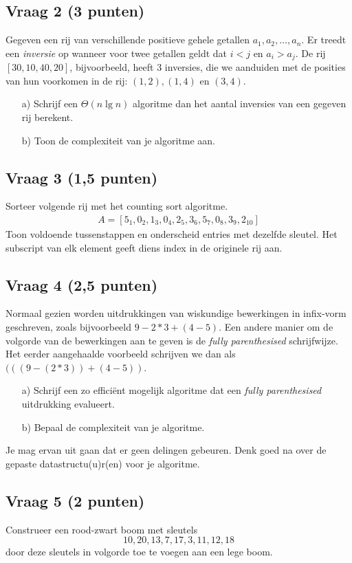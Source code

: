 \documentclass[kulak]{kulakarticle}
\begin{document}
	\subsection*{Vraag 2 (3 punten)}

	Gegeven een rij van verschillende positieve gehele getallen \(a_1, a_2, ..., a_n\). Er treedt een \textit{inversie} op wanneer voor twee getallen geldt dat \(i<j\) en \(a_i>a_j\). De rij \([30,10,40,20]\), bijvoorbeeld, heeft 3 inversies, die we aanduiden met de posities van hun voorkomen in de rij: \((1,2), (1,4)\) en \((3,4)\).

	\begin{itemize}
		\item[a)] Schrijf een \(\Theta(n \lg n)\) algoritme dan het aantal inversies van een gegeven rij berekent.
		\item[b)] Toon de complexiteit van je algoritme aan.
	\end{itemize}

	\subsection*{Vraag 3 (1,5 punten)}

	Sorteer volgende rij met het counting sort algoritme.
	\begin{align*}
		A = [5_1, 0_2, 1_3, 0_4, 2_5, 3_6, 5_7, 0_8, 3_9, 2_{10}]
	\end{align*}
	Toon voldoende tussenstappen en onderscheid entries met dezelfde sleutel. Het subscript van elk element geeft diens index in de originele rij aan.

	\subsection*{Vraag 4 (2,5 punten)}

	Normaal gezien worden uitdrukkingen van wiskundige bewerkingen in infix-vorm geschreven, zoals bijvoorbeeld  \(9-2*3+(4-5)\). Een andere manier om de volgorde van de bewerkingen aan te geven is de \textit{fully parenthesised} schrijfwijze. Het eerder aangehaalde voorbeeld schrijven we dan als \( (((9 - (2*3)) + (4 - 5)) \).

	\begin{enumerate}
		\item[a)] Schrijf een zo efficiënt mogelijk algoritme dat een \textit{fully parenthesised} uitdrukking evalueert.
		\item[b)] Bepaal de complexiteit van je algoritme.
	\end{enumerate}

	Je mag ervan uit gaan dat er geen delingen gebeuren. Denk goed na over de gepaste datastructu(u)r(en) voor je algoritme.

	\subsection*{Vraag 5 (2 punten)}

	Construeer een rood-zwart boom met sleutels \[10, 20, 13, 7, 17, 3, 11, 12, 18\] door deze sleutels in volgorde toe te voegen aan een lege boom.
\end{document}
